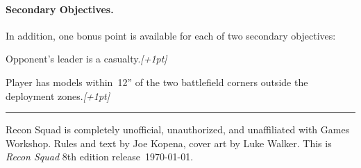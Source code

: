 \paragraph{Secondary Objectives.}
In addition, one bonus point is available for each of two secondary
objectives:

\begin{squishitemize}
\item Opponent's leader is a casualty.\hfill\emph{[+1pt]}
\item Player has models within~12'' of the two battlefield corners
  outside the deployment zones.\hfill\emph{[+1pt]}
\end{squishitemize}

\vfill
\hrule
\medskip
\noindent Recon Squad is completely unofficial, unauthorized, and
unaffiliated with Games Workshop.  Rules and text by Joe Kopena, cover
art by Luke Walker.  This is \emph{Recon Squad} 8th edition
release~\today.
